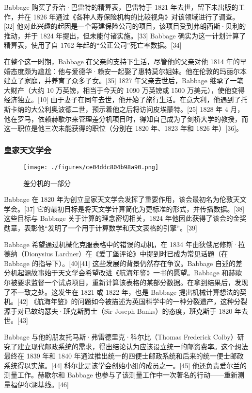 Babbage 购买了乔治·巴雷特的精算表，巴雷特于 1821 年去世，留下未出版的工作，并在 1826 年通过《各种人寿保险机构的比较视角》对该领域进行了调查。[32] 他对此兴趣的起因是一个筹建保险公司的项目，该项目受到弗朗西斯·贝利的推动，并于 1824 年提出，但未能付诸实施。[33] Babbage 确实为这一计划计算了精算表，使用了自 1762 年起的“公正公司”死亡率数据。[34]

在整个这一时期，Babbage 在父亲的支持下生活，尽管他的父亲对他 1814 年的早婚态度颇为尴尬：他与爱德华·赖安一起娶了惠特莫尔姐妹。他在伦敦的玛丽尔本建立了家庭，并养育了众多子女。[35] 1827 年父亲去世后，Babbage 继承了一笔大财产（大约 10 万英镑，相当于今天的 1090 万英镑或 1500 万美元），使他变得经济独立。[10] 由于妻子在同年去世，他开始了旅行生活。在意大利，他遇到了托斯卡纳的大公利奥波德二世，预示着他之后将访问皮埃蒙特。[25] 1828 年 4 月，他在罗马，依赖赫歇尔来管理差分机项目时，得知自己成为了剑桥大学的教授，而这一职位是他三次未能获得的职位（分别在 1820 年、1823 年和 1826 年）[36]。
\subsubsection{皇家天文学会}  
\begin{figure}[ht]
\centering
\texttt{[image: ./figures/ce04ddc804b98a90.png]}
\caption{差分机的一部分} \label{fig_CRSBQ_7}
\end{figure}
Babbage 在 1820 年为创立皇家天文学会发挥了重要作用，该会最初名为伦敦天文学会。[37] 它的最初目标是将天文学计算简化为更标准的形式，并传播数据。[38] 这些目标与 Babbage 关于计算的理念密切相关，1824 年他因此获得了该会的金奖勋章，表彰他“发明了一个用于计算数学和天文表格的引擎”。[39]

Babbage 希望通过机械化克服表格中的错误的动机，在 1834 年由狄俄尼修斯·拉德纳（Dionysius Lardner）在《爱丁堡评论》中提到时已成为常见话题（在 Babbage 的指导下）。[40][41] 这些发展的背景仍然存在争议。Babbage 自述的差分机起源故事始于天文学会希望改进《航海年鉴》一书的愿望。Babbage 和赫歇尔被要求监督一个试点项目，重新计算该表格的某部分数据。在拿到结果后，发现了不一致之处。这发生在 1821 或 1822 年，也是 Babbage 提出机械计算想法的契机。[42] 《航海年鉴》的问题如今被描述为英国科学中的一种分裂遗产，这种分裂源于对已故约瑟夫·班克斯爵士（Sir Joseph Banks）的态度，班克斯于 1820 年去世。[43]

Babbage 与他的朋友托马斯·弗雷德里克·科尔比（Thomas Frederick Colby）研究了建立现代邮政系统的需求，得出结论认为应该设立统一的邮资费率。这个想法最终在 1839 年和 1840 年通过推出统一的四便士邮政系统和后来的统一便士邮政系统得以实施。[44] 科尔比是该学会创始小组的成员之一。[45] 他还负责爱尔兰的测量工作。赫歇尔和 Babbage 也参与了该测量工作中一次著名的行动——重新测量福伊尔湖基线。[46]
